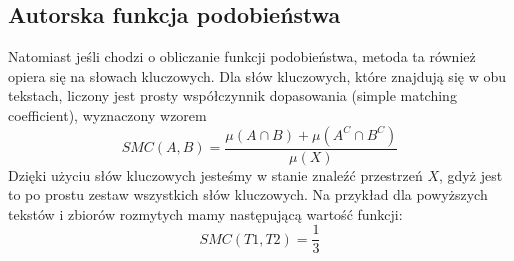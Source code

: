 \documentclass[a4paper]{classrep}
\begin{document}
\subsection{Autorska funkcja podobieństwa}
\label{sec:autorskiepodobienstwo}
Natomiast jeśli chodzi o obliczanie funkcji podobieństwa, metoda ta również opiera się na słowach kluczowych. Dla słów kluczowych, które znajdują się w obu tekstach, liczony jest prosty współczynnik dopasowania (simple matching coefficient), wyznaczony
wzorem
\begin{equation}
SMC(A,B) = \frac{\mu(A \cap B)+\mu(A^C \cap B^C)}{\mu(X)}
\end{equation}
Dzięki użyciu słów kluczowych jesteśmy w stanie znaleźć przestrzeń \(X\), gdyż jest to po prostu zestaw wszystkich słów kluczowych.
Na przykład dla powyższych tekstów i zbiorów rozmytych mamy następującą wartość funkcji:
\[SMC(T1,T2) = \frac{1}{3}\]
%
%
\end{document}
